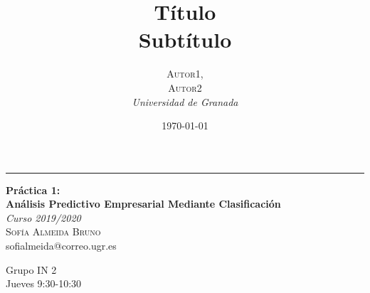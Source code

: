 \documentclass[a4paper, 20pt]{article}
\title{\textbf{Título}\\ %
Subtítulo} %
\author{\textsc{Autor1,\\Autor2} %
\\{\textit{Universidad de Granada}}} %
\date{\today} %
\begin{document}

\begin{titlepage} %
	
	\raggedleft %
	
	\rule{1pt}{\textheight} %
	\hspace{0.05\textwidth} %
	\parbox[b]{0.8\textwidth}{ %
		
		{\Huge\bfseries Práctica 1:\\[0.5\baselineskip] Análisis Predictivo Empresarial Mediante Clasificación}\\[2\baselineskip] %
		{\large\textit{Curso 2019/2020}}\\[4\baselineskip] %
		{\Large\textsc{Sofía Almeida Bruno}\\[0.5\baselineskip]sofialmeida@correo.ugr.es} %
		
		\vspace{0.4\textheight} %
		
		{\noindent Grupo IN 2\\[0.5\baselineskip] Jueves 9:30-10:30}\\[\baselineskip] %
	}

\end{titlepage}




{\parskip=2pt
  \tableofcontents
}
\pagebreak
\end{document}
